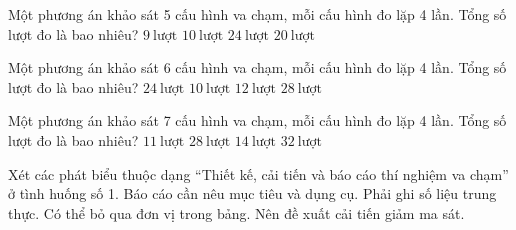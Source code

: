 \begin{ex}
Một phương án khảo sát 5 cấu hình va chạm, mỗi cấu hình đo lặp 4 lần. Tổng số lượt đo là bao nhiêu?
\choice
{$9\ \mathrm{lượt}$}
{$10\ \mathrm{lượt}$}
{$24\ \mathrm{lượt}$}
{\True $20\ \mathrm{lượt}$}
\end{ex}

\begin{ex}
Một phương án khảo sát 6 cấu hình va chạm, mỗi cấu hình đo lặp 4 lần. Tổng số lượt đo là bao nhiêu?
\choice
{\True $24\ \mathrm{lượt}$}
{$10\ \mathrm{lượt}$}
{$12\ \mathrm{lượt}$}
{$28\ \mathrm{lượt}$}
\end{ex}

\begin{ex}
Một phương án khảo sát 7 cấu hình va chạm, mỗi cấu hình đo lặp 4 lần. Tổng số lượt đo là bao nhiêu?
\choice
{$11\ \mathrm{lượt}$}
{\True $28\ \mathrm{lượt}$}
{$14\ \mathrm{lượt}$}
{$32\ \mathrm{lượt}$}
\end{ex}

\begin{ex}
Xét các phát biểu thuộc dạng “Thiết kế, cải tiến và báo cáo thí nghiệm va chạm” ở tình huống số 1.
\choiceTF
{\True Báo cáo cần nêu mục tiêu và dụng cụ.}
{\True Phải ghi số liệu trung thực.}
{Có thể bỏ qua đơn vị trong bảng.}
{\True Nên đề xuất cải tiến giảm ma sát.}
\end{ex}

